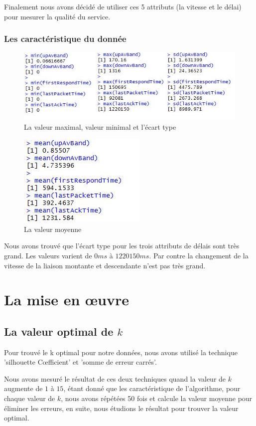 Finalement nous avons décidé de utiliser ces 5 attributs (la vitesse et le délai) pour mesurer la qualité du service.

\subsubsection{Les caractéristique du donnée}



\begin{figure}[H]
\centering
\includegraphics[width=0.8\linewidth, height=0.2\textheight]{images/max-min}
\caption{La valeur maximal, valeur minimal et l'écart type}
\label{fig:max-min}
\end{figure}

\begin{figure}[H]
\centering
\includegraphics[width=0.3\linewidth]{images/mean}
\caption{La valeur moyenne}
\label{fig:mean}
\end{figure}

Nous avons trouvé que l'écart type pour les trois attributs de délais sont très grand. Les valeurs varient de $0ms$ à $1220150ms$. Par contre la changement  de la vitesse de la liaison montante et descendante n'est pas très grand.

\section{La mise en \oe uvre}
\subsection{La valeur optimal de $k$}
Pour trouvé le k optimal pour notre données, nous avons utilisé la technique 'silhouette C\oe fficient' et 'somme de erreur carrés'.

Nous avons mesuré le résultat de ces deux techniques quand la valeur de $k$ augmente de $1$ à $15$, étant donné que les caractéristique de l'algorithme, pour chaque valeur de $k$, nous avons répétées 50 fois et calcule la valeur moyenne pour éliminer les erreurs, en suite, nous étudions le résultat pour trouver la valeur optimal.
